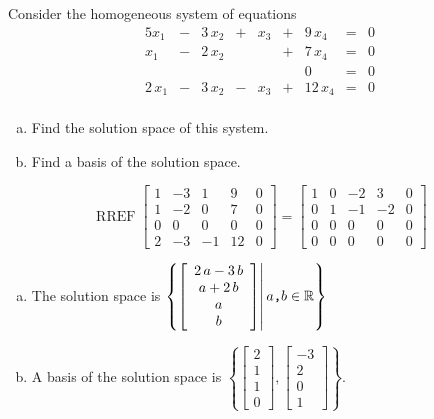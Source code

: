 
\begin{exerciseStatement}


Consider the homogeneous system of equations 
\begin{alignat*}{5} x_{1} &-& 3 \, x_{2} &+& x_{3} &+& 9 \, x_{4} &=& 0 \\x_{1} &-& 2 \, x_{2} & &  &+& 7 \, x_{4} &=& 0 \\ & &  & &  & & 0 &=& 0 \\2 \, x_{1} &-& 3 \, x_{2} &-& x_{3} &+& 12 \, x_{4} &=& 0 \\ \end{alignat*}
            


\begin{enumerate}[(a)]
\item  Find the solution space of this system.
\item  Find a basis of the solution space.
\end{enumerate}
    
\end{exerciseStatement}
    
\begin{exerciseAnswer} 


\[\operatorname{RREF} \left[\begin{array}{cccc|c}
1 & -3 & 1 & 9 & 0 \\
1 & -2 & 0 & 7 & 0 \\
0 & 0 & 0 & 0 & 0 \\
2 & -3 & -1 & 12 & 0
\end{array}\right] = \left[\begin{array}{cccc|c}
1 & 0 & -2 & 3 & 0 \\
0 & 1 & -1 & -2 & 0 \\
0 & 0 & 0 & 0 & 0 \\
0 & 0 & 0 & 0 & 0
\end{array}\right] \]


\begin{enumerate}[(a)]
\item The solution space is \( \left\{ \left[\begin{array}{c}
2 \, a - 3 \, b \\
a + 2 \, b \\
a \\
b
\end{array}\right] \middle|\,a\text{\texttt{,}}b\in\mathbb{R}\right\} \)
\item A basis of the solution space is \( \left\{ \left[\begin{array}{c}
2 \\
1 \\
1 \\
0
\end{array}\right] , \left[\begin{array}{c}
-3 \\
2 \\
0 \\
1
\end{array}\right] \right\} \).
\end{enumerate}
    
\end{exerciseAnswer}
    
